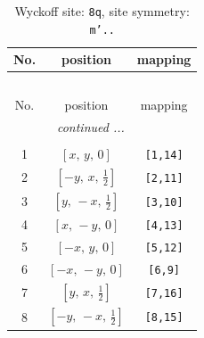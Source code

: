 \documentclass[fleqn,8pt]{jsarticle}
\begin{document}
\begin{longtable}{ccc}
\caption{Wyckoff site: {\tt 8q}, site symmetry: {\tt m'..}}
 \\
 \hline \hline
No. & position & mapping \\ \hline \endfirsthead

\multicolumn{2}{l}{\tablename\ \thetable{}} \\
 \hline \hline
No. & position & mapping \\ \hline \endhead

 \hline \hline
\multicolumn{2}{r}{\footnotesize\it continued ...} \\ \endfoot

 \hline \hline
\multicolumn{2}{r}{} \\ \endlastfoot

1 & $\left[ x,\, y,\, 0 \right]$ & {\tt [1,14]} \\ \hline
2 & $\left[ - y,\, x,\, \frac{1}{2} \right]$ & {\tt [2,11]} \\ \hline
3 & $\left[ y,\, - x,\, \frac{1}{2} \right]$ & {\tt [3,10]} \\ \hline
4 & $\left[ x,\, - y,\, 0 \right]$ & {\tt [4,13]} \\ \hline
5 & $\left[ - x,\, y,\, 0 \right]$ & {\tt [5,12]} \\ \hline
6 & $\left[ - x,\, - y,\, 0 \right]$ & {\tt [6,9]} \\ \hline
7 & $\left[ y,\, x,\, \frac{1}{2} \right]$ & {\tt [7,16]} \\ \hline
8 & $\left[ - y,\, - x,\, \frac{1}{2} \right]$ & {\tt [8,15]} \\
\end{longtable}
\renewcommand{\arraystretch}{1.2}
\end{document}
